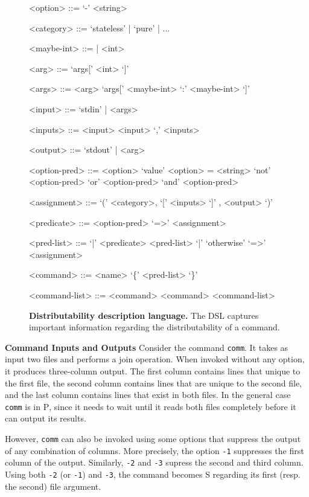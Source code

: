 \documentclass[sigplan,10pt,review,anonymous]{acmart}
\newcommand{\heading}[1]{\vspace{4pt}\noindent\textbf{#1}\enspace}
\newcommand{\ttt}[1]{\texttt{\small #1}}
\newcommand{\cn}[1]{\mbox{\textcircled{\footnotesize #1}}}
\newcommand{\pur}{\cn{\textsc{P}}\xspace}
\newcommand{\sta}{\cn{\textsc{S}}\xspace}
\begin{document}
\begin{figure}
  \centering
  \begin{grammar}
    <option> ::= `-' <string>

    <category> ::= `stateless' | `pure' | ...

    <maybe-int> ::= | <int>

    <arg> ::= `args[' <int> `]'

    <args> ::= <arg>
    \alt `args[' <maybe-int> `:' <maybe-int> `]'

    <input> ::= `stdin' | <args>

    <inputs> ::= <input>
    \alt <input> `,' <inputs>

    <output> ::= `stdout' | <arg>

    <option-pred> ::= <option>
    \alt `value' <option> = <string>
    \alt `not' <option-pred>
     `or' <option-pred>
     `and' <option-pred>

    <assignment> ::= `(' <category>, `[' <inputs> `]' , <output> `)'

    <predicate> ::= <option-pred> `=>' <assignment>

    <pred-list> ::= `|' <predicate> <pred-list>
    \alt `|' `otherwise' `=>' <assignment>

    <command> ::= <name> `\{' <pred-list> `\}'

    <command-list> ::= <command>
    \alt <command> <command-list>
  \end{grammar}
  \caption{
\textbf{Distributability description language.}
The DSL captures important information regarding the distributability of a command.
\vspace{-20pt}
}

  \label{fig:dsl}
\end{figure}



\heading{Command Inputs and Outputs}
%
Consider the command \ttt{comm}. It takes as input two files and
performs a join operation. When invoked without any option, it
produces three-column output. The first column contains lines that
unique to the first file, the second column contains lines that are
unique to the second file, and the last column contains lines that
exist in both files. In the general case \ttt{comm} is in \pur, since
it needs to wait until it reads both files completely before it can
output its results.

However, \ttt{comm} can also be invoked using some options that
suppress the output of any combination of columns. More precisely, the
option \ttt{-1} suppresses the first column of the output. Similarly,
\ttt{-2} and \ttt{-3} supress the second and third column. Using both
\ttt{-2} (or \ttt{-1}) and \ttt{-3}, the command becomes \sta
regarding its first (resp. the second) file argument.
\end{document}
